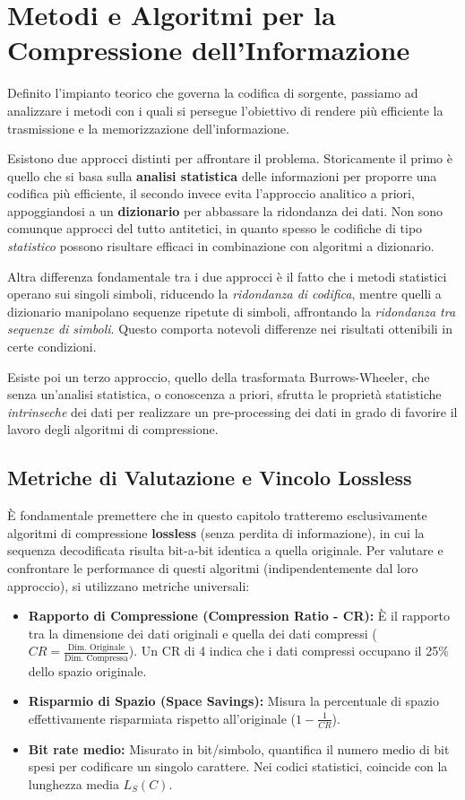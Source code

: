 \chapter{Metodi e Algoritmi per la Compressione dell'Informazione}
Definito l'impianto teorico che governa la codifica di sorgente, passiamo ad analizzare i metodi con i quali si persegue l'obiettivo di rendere più efficiente la trasmissione e la memorizzazione dell'informazione.

Esistono due approcci distinti per affrontare il problema. Storicamente il primo è quello che si basa sulla \textbf{analisi statistica} delle informazioni per proporre una codifica più efficiente, il secondo invece evita l'approccio analitico a priori, appoggiandosi a un \textbf{dizionario} per abbassare la ridondanza dei dati. Non sono comunque approcci del tutto antitetici, in quanto spesso le codifiche di tipo \textit{statistico} possono risultare efficaci in combinazione con algoritmi a dizionario.

Altra differenza fondamentale tra i due approcci è il fatto che i metodi statistici operano sui singoli simboli, riducendo la \textit{ridondanza di codifica}, mentre quelli a dizionario manipolano sequenze ripetute di simboli, affrontando la \textit{ridondanza tra sequenze di simboli}. Questo comporta notevoli differenze nei risultati ottenibili in certe condizioni.

Esiste poi un terzo approccio, quello della trasformata Burrows-Wheeler, che senza un'analisi statistica, o conoscenza a priori, sfrutta le proprietà statistiche \textit{intrinseche} dei dati per realizzare un pre-processing dei dati in grado di favorire il lavoro degli algoritmi di compressione. 

\section{Metriche di Valutazione e Vincolo Lossless}
È fondamentale premettere che in questo capitolo tratteremo esclusivamente algoritmi di compressione \textbf{lossless} (senza perdita di informazione), in cui la sequenza decodificata risulta bit-a-bit identica a quella originale. 
Per valutare e confrontare le performance di questi algoritmi (indipendentemente dal loro approccio), si utilizzano metriche universali:
\begin{itemize}
    \item \textbf{Rapporto di Compressione (Compression Ratio - CR):} È il rapporto tra la dimensione dei dati originali e quella dei dati compressi ($CR = \frac{\text{Dim. Originale}}{\text{Dim. Compressa}}$). Un CR di 4 indica che i dati compressi occupano il 25\% dello spazio originale.
    \item \textbf{Risparmio di Spazio (Space Savings):} Misura la percentuale di spazio effettivamente risparmiata rispetto all'originale ($1 - \frac{1}{CR}$).
    \item \textbf{Bit rate medio:} Misurato in bit/simbolo, quantifica il numero medio di bit spesi per codificare un singolo carattere. Nei codici statistici, coincide con la lunghezza media $L_S(C)$.
\end{itemize}

